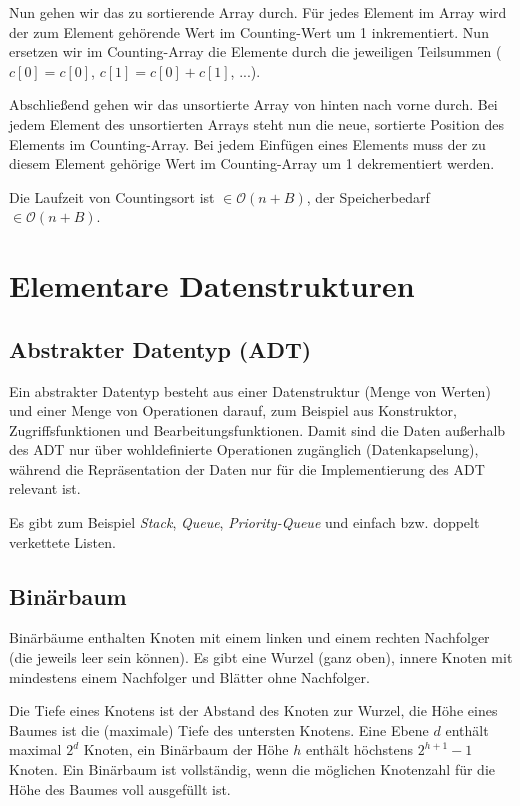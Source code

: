 \documentclass[12pt]{article}
\begin{document}
Nun gehen wir das zu sortierende Array durch. Für jedes Element im Array wird der zum Element gehörende Wert im Counting-Wert um 1 inkrementiert. Nun ersetzen wir im Counting-Array die Elemente durch die jeweiligen Teilsummen ($c[0] = c[0]$, $c[1] = c[0] + c[1]$, ...).

Abschließend gehen wir das unsortierte Array von hinten nach vorne durch. Bei jedem Element des unsortierten Arrays steht nun die neue, sortierte Position des Elements im Counting-Array. Bei jedem Einfügen eines Elements muss der zu diesem Element gehörige Wert im Counting-Array um 1 dekrementiert werden.

Die Laufzeit von Countingsort ist $\in \mathcal O(n+B)$, der Speicherbedarf $\in \mathcal O(n+B)$.

\section{Elementare Datenstrukturen}

\subsection{Abstrakter Datentyp (ADT)}

Ein abstrakter Datentyp besteht aus einer Datenstruktur (Menge von Werten) und einer Menge von Operationen darauf, zum Beispiel aus Konstruktor, Zugriffsfunktionen und Bearbeitungsfunktionen. Damit sind die Daten außerhalb des ADT nur über wohldefinierte Operationen zugänglich (Datenkapselung), während die Repräsentation der Daten nur für die Implementierung des ADT relevant ist.

Es gibt zum Beispiel \textit{Stack}, \textit{Queue}, \textit{Priority-Queue} und einfach bzw. doppelt verkettete Listen.

\subsection{Binärbaum}

Binärbäume enthalten Knoten mit einem linken und einem rechten Nachfolger (die jeweils leer sein können). Es gibt eine Wurzel (ganz oben), innere Knoten mit mindestens einem Nachfolger und Blätter ohne Nachfolger.

Die Tiefe eines Knotens ist der Abstand des Knoten zur Wurzel, die Höhe eines Baumes ist die (maximale) Tiefe des untersten Knotens. Eine Ebene $d$ enthält maximal $2^d$ Knoten, ein Binärbaum der Höhe $h$ enthält höchstens $2^{h+1}-1$ Knoten. Ein Binärbaum ist vollständig, wenn die möglichen Knotenzahl für die Höhe des Baumes voll ausgefüllt ist.
\end{document}
